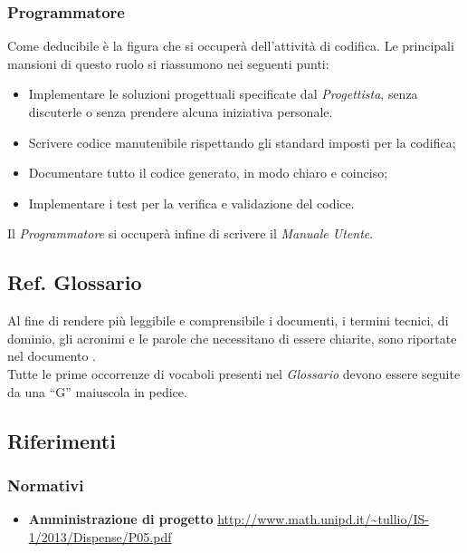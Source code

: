 \subsubsection{Programmatore}
Come deducibile è la figura che si occuperà dell'attività di codifica. Le principali mansioni di questo ruolo si riassumono nei seguenti punti:
\begin{itemize}
\item Implementare le soluzioni progettuali specificate dal \textit{Progettista}, senza discuterle o senza prendere alcuna iniziativa personale.
\item Scrivere codice manutenibile rispettando gli standard imposti per la codifica;
\item Documentare tutto il codice generato, in modo chiaro e coinciso;
\item Implementare i test per la verifica e validazione del codice.
\end{itemize}
Il \textit{Programmatore} si occuperà infine di scrivere il \textit{Manuale Utente}.
\subsection{Ref. Glossario}
Al fine di rendere più leggibile e comprensibile i documenti, i termini tecnici, di dominio, gli acronimi e le parole che necessitano di essere chiarite, sono riportate nel documento \Glossario{}.\\
Tutte le prime occorrenze di vocaboli presenti nel \textit{Glossario} devono essere seguite da una ``G'' maiuscola in pedice.

\subsection{Riferimenti}

\subsubsection{Normativi}
\begin{itemize}
	\item \textbf{Amministrazione di progetto} \url{http://www.math.unipd.it/~tullio/IS-1/2013/Dispense/P05.pdf} 
\end{itemize}
